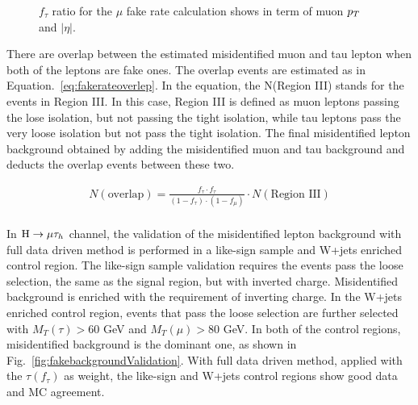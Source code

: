 \begin{figure}[htbp] 
     \centering
     \caption{$f_{\tau}$ ratio for the $\mu$ fake rate calculation shows in term of muon $p_{T}$ and $|\eta|$.}
     \label{fig:muonfakerationumber}
\end{figure}

There are overlap between the estimated misidentified muon and tau lepton when both of the leptons are fake ones. The overlap events are estimated as in Equation.~\ref{eq:fakerateoverlep}. In the equation, the N(Region III) stands for the events in Region III. In this case, Region III is defined as muon leptons passing the lose isolation, but not passing the tight isolation, while tau leptons pass the very loose isolation but not pass the tight isolation. The final misidentified lepton background obtained by adding the misidentified muon and tau background and deducts the overlap events between these two. 

\begin{align} 
N(\text{overlap})=\frac{f_{\tau}\cdot f_{\tau}}{(1-f_{\tau})\cdot (1-f_{\mu})}\cdot N(\text{Region\ III}) \\\label{eq:fakerateoverlep}
\end{align}



In $\mathrm{H}\to \mu\tau_{h}$ channel, the validation of the misidentified lepton background with full data driven method is performed in a like-sign sample and W+jets enriched control region. The like-sign sample validation requires the events pass the loose selection, the same as the signal region, but with inverted charge. Misidentified background is enriched with the requirement of inverting charge. In the W+jets enriched control region, events that pass the loose selection are further selected with  $M_T(\tau)>60$ GeV and $M_T(\mu)>80$ GeV.  In both of the control regions, misidentified background is the dominant one, as shown in Fig.~\ref{fig:fakebackgroundValidation}. With full data driven method, applied with the $\tau(f_{\tau})$ as weight, the like-sign and W+jets control regions show good data and MC agreement. 


